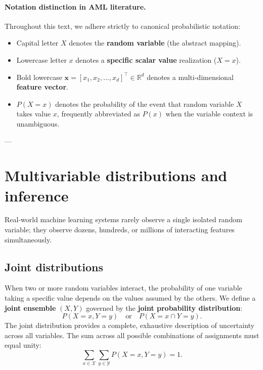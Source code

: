 \paragraph{Notation distinction in AML literature.}
Throughout this text, we adhere strictly to canonical probabilistic notation:
\begin{itemize}[noitemsep]
  \item Capital letter $X$ denotes the \textbf{random variable} (the abstract mapping).
  \item Lowercase letter $x$ denotes a \textbf{specific scalar value} realization ($X = x$).
  \item Bold lowercase $\mathbf{x} = [x_1, x_2, \dots, x_d]^\top \in \mathbb{R}^d$ denotes a multi-dimensional \textbf{feature vector}.
  \item $P(X = x)$ denotes the probability of the event that random variable $X$ takes value $x$, frequently abbreviated as $P(x)$ when the variable context is unambiguous.
\end{itemize}

---

\section{Multivariable distributions and inference}
\label{sec:multivariable_inference}

Real-world machine learning systems rarely observe a single isolated random variable; they observe dozens, hundreds, or millions of interacting features simultaneously.

\subsection{Joint distributions}
\label{sec:joint_distributions}

When two or more random variables interact, the probability of one variable taking a specific value depends on the values assumed by the others. We define a \textbf{joint ensemble} $(X, Y)$ governed by the \textbf{joint probability distribution}:
\begin{equation}
P(X = x, Y = y) \quad \text{or} \quad P(X = x \cap Y = y).
\end{equation}
The joint distribution provides a complete, exhaustive description of uncertainty across all variables. The sum across all possible combinations of assignments must equal unity:
\begin{equation}
\sum_{x \in \mathcal{X}} \sum_{y \in \mathcal{Y}} P(X = x, Y = y) = 1.
\label{eq:joint_normalization}
\end{equation}

